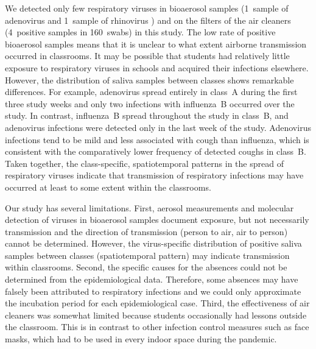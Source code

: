 \documentclass[fleqn,11pt]{wlscirep}
\begin{document}

We detected only few respiratory viruses in bioaerosol samples (1~sample of adenovirus and 1~sample of rhinovirus ) and on the filters of the air cleaners (4~positive samples in 160~swabs) in this study. The low rate of positive bioaerosol samples means that it is unclear to what extent airborne transmission occurred in classrooms. It may be possible that students had relatively little exposure to respiratory viruses in schools and acquired their infections elsewhere. However, the distribution of saliva samples between classes shows remarkable differences. For example, adenovirus spread entirely in class~A during the first three study weeks and only two infections with influenza~B occurred over the study. In contrast, influenza~B spread throughout the study in class~B, and adenovirus infections were detected only in the last week of the study. Adenovirus infections tend to be mild\cite{Kunz2010CIDR} and less associated with cough than influenza\cite{Ma2018RMV}, which is consistent with the comparatively lower frequency of detected coughs in class~B. Taken together, the class-specific, spatiotemporal patterns in the spread of respiratory viruses indicate that transmission of respiratory infections may have occurred at least to some extent within the classrooms. 



Our study has several limitations. First, aerosol measurements and molecular detection of viruses in bioaerosol samples document exposure, but not necessarily transmission and the direction of transmission (person to air, air to person) cannot be determined. However, the virus-specific distribution of positive saliva samples between classes (spatiotemporal pattern) may indicate transmission within classrooms. Second, the specific causes for the absences could not be determined from the epidemiological data. Therefore, some absences may have falsely been attributed to respiratory infections and we could only approximate the incubation period for each epidemiological case. Third, the effectiveness of air cleaners was somewhat limited because students occasionally had lessons outside the classroom. This is in contrast to other infection control measures such as face masks, which had to be used in every indoor space during the pandemic.

\end{document}
